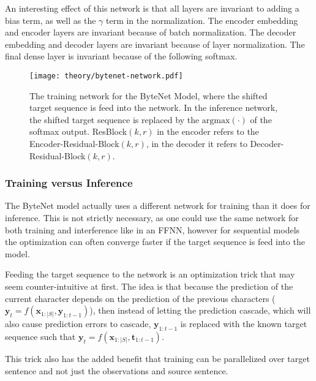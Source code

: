 An interesting effect of this network is that all layers are invariant to adding a bias term, as well as the $\gamma$ term in the normalization. The encoder embedding and encoder layers are invariant because of batch normalization. The decoder embedding and decoder layers are invariant because of layer normalization. The final dense layer is invariant because of the following softmax.

\begin{figure}[H]
    \centering
    \texttt{[image: theory/bytenet-network.pdf]}
    \caption{The training network for the ByteNet Model, where the shifted target sequence is feed into the network. In the inference network, the shifted target sequence is replaced by the $\mathrm{argmax}(\cdot)$ of the softmax output. ResBlock$(k, r)$ in the encoder refers to the Encoder-Residual-Block$(k, r)$, in the decoder it refers to Decoder-Residual-Block$(k, r)$.}
    \label{fig:bytenet:network}
\end{figure}

\subsubsection{Training versus Inference}
The ByteNet model actually uses a different network for training than it does for inference. This is not strictly necessary, as one could use the same network for both training and interference like in an FFNN, however for sequential models the optimization can often converge faster if the target sequence is feed into the model.

Feeding the target sequence to the network is an optimization trick that may seem counter-intuitive at first. The idea is that because the prediction of the current character depends on the prediction of the previous characters ($\mathbf{y}_t = f(\mathbf{x}_{1:|S|}, \mathbf{y}_{1:t-1})$), then instead of letting the prediction cascade, which will also cause prediction errors to cascade, $\mathbf{y}_{1:t-1}$ is replaced with the known target sequence such that $\mathbf{y}_t = f(\mathbf{x}_{1:|S|}, \mathbf{t}_{1:t-1})$.

This trick also has the added benefit that training can be parallelized over target sentence and not just the observations and source sentence. 

